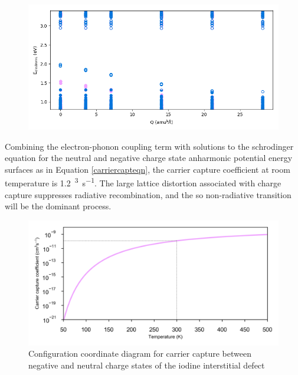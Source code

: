 \begin{figure}[h!]   
\centering
  \includegraphics[width=1.0\columnwidth]{figures/ch6/eigs.png}
  \caption[ ]{}
\label{eigenvalues}
\end{figure}

Combining the electron-phonon coupling term with solutions to the schrodinger equation for the neutral and negative charge state anharmonic potential energy surfaces as in Equation \ref{carriercapteqn}, the carrier capture coefficient at room temperature is \SI{1.2}{\centimetre\cubed\per\second}.
The large lattice distortion associated with charge capture suppresses radiative recombination, and the so non-radiative transition will be the dominant process.
\autocite{theory of defects in solids}


\begin{figure}[h!]   
\centering
  \includegraphics[width=1.0\columnwidth]{figures/ch6/carrier_capture_rate.png}
  \caption[Rate of electron capture at the ]{Configuration coordinate diagram for carrier capture between negative and neutral charge states of the iodine interstitial defect}
\label{carrier_capture_rate}
\end{figure}




